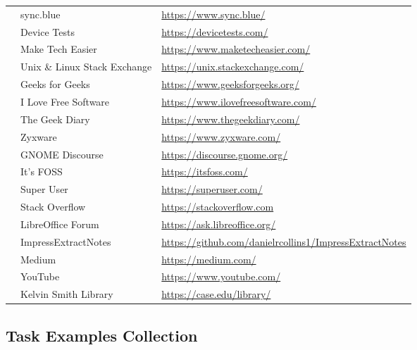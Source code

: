 \begin{longtable}{cll}
&   sync.blue & \url{https://www.sync.blue/} \\
&   Device Tests & \url{https://devicetests.com/} \\
&   Make Tech Easier & \url{https://www.maketecheasier.com/} \\
&   Unix \& Linux Stack Exchange & \url{https://unix.stackexchange.com/} \\
&   Geeks for Geeks & \url{https://www.geeksforgeeks.org/} \\
&   I Love Free Software & \url{https://www.ilovefreesoftware.com/} \\
&   The Geek Diary & \url{https://www.thegeekdiary.com/} \\
&   Zyxware & \url{https://www.zyxware.com/} \\
&   GNOME Discourse & \url{https://discourse.gnome.org/} \\
&   It's FOSS & \url{https://itsfoss.com/} \\
&   Super User & \url{https://superuser.com/} \\
&   Stack Overflow & \url{https://stackoverflow.com} \\
&   LibreOffice Forum & \url{https://ask.libreoffice.org/} \\
&   ImpressExtractNotes & \url{https://github.com/danielrcollins1/ImpressExtractNotes} \\
&    Medium & \url{https://medium.com/} \\
&   YouTube & \url{https://www.youtube.com/} \\
&   Kelvin Smith Library & \url{https://case.edu/library/} \\
\end{longtable}

\subsection{Task Examples Collection}
\label{app:examples_collection}

